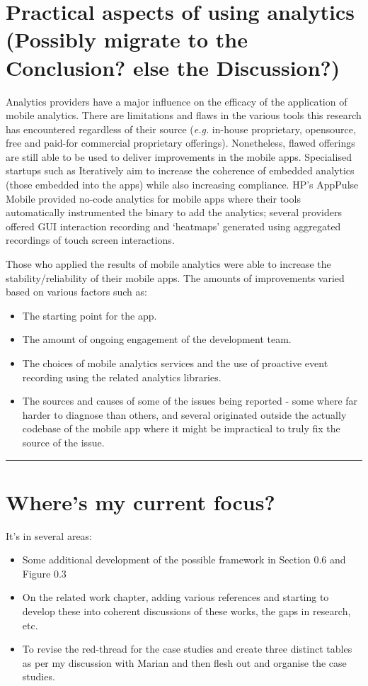 \section[Practical aspects of using analytics]{Practical aspects of using analytics \\ \small{(Possibly migrate to the Conclusion? else the Discussion?)}}
Analytics providers have a major influence on the efficacy of the application of mobile analytics. There are limitations and flaws in the various tools this research has encountered regardless of their source (\emph{e.g.} in-house proprietary, opensource, free and paid-for commercial proprietary offerings). Nonetheless, flawed offerings are still able to be used to deliver improvements in the mobile apps. Specialised startups such as Iteratively aim to increase the coherence of embedded analytics (those embedded into the apps) while also increasing compliance. HP's AppPulse Mobile provided no-code analytics for mobile apps where their tools automatically instrumented the binary to add the analytics; several providers offered GUI interaction recording and `heatmaps' generated using aggregated recordings of touch screen interactions.

Those who applied the results of mobile analytics were able to increase the stability/reliability of their mobile apps. The amounts of improvements varied based on various factors such as:
\begin{itemize}
    \itemsep0em
    \item The starting point for the app.
    \item The amount of ongoing engagement of the development team.
    \item The choices of mobile analytics services and the use of proactive event recording using the related analytics libraries.
    \item The sources and causes of some of the issues being reported - some where far harder to diagnose than others, and several originated outside the actually codebase of the mobile app where it might be impractical to truly fix the source of the issue.
\end{itemize}

\noindent
\rule{\textwidth}{0.4pt}

\clearpage
\section{Where's my current focus?}
It's in several areas:
\begin{itemize}
    \item Some additional development of the possible framework in Section 0.6 and Figure 0.3
    \item On the related work chapter, adding various references and starting to develop these into coherent discussions of these works, the gaps in research, etc.
    \item To revise the red-thread for the case studies and create three distinct tables as per my discussion with Marian and then flesh out and organise the case studies.
\end{itemize}

